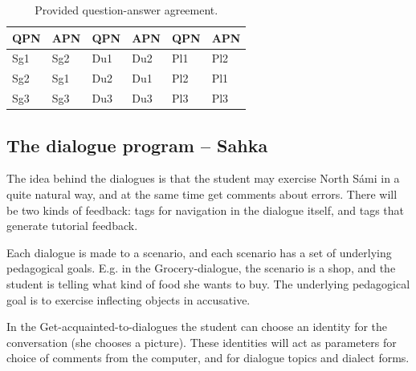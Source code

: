 \documentclass[11pt]{article}
\begin{document}
\begin{table}[htdp]
\caption{Provided question-answer agreement.}
\begin{center}
\begin{tabular}[t]{ll|ll|ll}
QPN &APN &QPN &APN &QPN &APN \\
\hline
Sg1 &Sg2 &Du1 &Du2 &Pl1 &Pl2 \\
Sg2 &Sg1 &Du2 &Du1 &Pl2 &Pl1 \\
Sg3 &Sg3 &Du3 &Du3 &Pl3 &Pl3 \\
\hline
\end{tabular}
\end{center}
\label{QA}
\end{table}




\subsection{The dialogue program -- Sahka}
The idea behind the dialogues is that the student may exercise North Sámi in a quite natural way, and at the same time get comments about errors. There will be two kinds of feedback: tags for navigation in the dialogue itself, and tags that generate tutorial feedback.

Each dialogue is made to a scenario, and each scenario has a set of underlying pedagogical goals. E.g. in the Grocery-dialogue, the scenario is a shop, and the student is telling what kind of food she wants to buy. The underlying pedagogical goal is to exercise inflecting objects in accusative.


In the Get-acquainted-to-dialogues the student can choose an identity for the conversation (she chooses a picture). These identities will act as parameters for choice of comments from the computer, and for dialogue topics and dialect forms.
\end{document}
